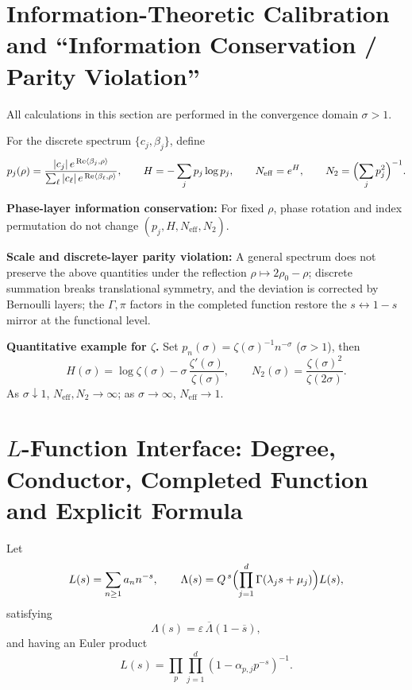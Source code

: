 \documentclass[11pt,a4paper]{article}
\theoremstyle{remark}
\DeclareMathOperator{\Re}{Re}
\begin{document}
\section{Information-Theoretic Calibration and ``Information Conservation / Parity Violation''}\label{sec:info}

All calculations in this section are performed in the convergence domain $\sigma>1$.

For the discrete spectrum $\{c_j,\beta_j\}$, define
\begin{equation}
p_j(\rho)=\frac{|c_j|\,e^{\,\Re\langle\beta_j,\rho\rangle}}{\sum_\ell |c_\ell|\,e^{\,\Re\langle\beta_\ell,\rho\rangle}},\qquad
H=-\sum_j p_j\log p_j,\qquad
N_{\mathrm{eff}}=e^{H},\qquad
N_2=\Bigl(\sum_j p_j^2\Bigr)^{-1}.
\end{equation}

\textbf{Phase-layer information conservation:} For fixed $\rho$, phase rotation and index permutation do not change $(p_j,H,N_{\mathrm{eff}},N_2)$.

\textbf{Scale and discrete-layer parity violation:} A general spectrum does not preserve the above quantities under the reflection $\rho\mapsto 2\rho_0-\rho$; discrete summation breaks translational symmetry, and the deviation is corrected by Bernoulli layers; the $\Gamma,\pi$ factors in the completed function restore the $s\leftrightarrow 1-s$ mirror at the functional level.

\textbf{Quantitative example for $\zeta$.} Set $p_n(\sigma)=\zeta(\sigma)^{-1}n^{-\sigma}$ ($\sigma>1$), then
\begin{equation}
H(\sigma)=\log\zeta(\sigma)-\sigma\,\frac{\zeta'(\sigma)}{\zeta(\sigma)},\qquad
N_2(\sigma)=\frac{\zeta(\sigma)^2}{\zeta(2\sigma)}.
\end{equation}
As $\sigma\downarrow1$, $N_{\mathrm{eff}},N_2\to\infty$; as $\sigma\to\infty$, $N_{\mathrm{eff}}\to1$.

\section{$L$-Function Interface: Degree, Conductor, Completed Function and Explicit Formula}

Let
\begin{equation}
L(s)=\sum_{n\ge1}a_n n^{-s},\qquad
\Lambda(s)=Q^{\,s}\Bigl(\prod_{j=1}^{d}\Gamma(\lambda_js+\mu_j)\Bigr)L(s),
\end{equation}
satisfying
\begin{equation}
\Lambda(s)=\varepsilon\,\overline{\Lambda}(1-\overline{s}),
\end{equation}
and having an Euler product
\begin{equation}
L(s)=\prod_{p}\prod_{j=1}^{d}(1-\alpha_{p,j}p^{-s})^{-1}.
\end{equation}
\end{document}
